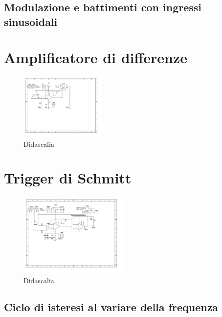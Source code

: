 \documentclass[journal]{IEEEtran}
\begin{document}
\subsection{Modulazione e battimenti con ingressi sinusoidali}



\section{Amplificatore di differenze} %
\begin{figure}[H]%
\begin {center}
\includegraphics[width=0.38\textwidth]{sch-simulations/output/OPA-difference-amp.pdf}
\caption{Didascalia}
\label{fig:oscilloscope}
\end {center}
\end{figure}

\section{Trigger di Schmitt} %

\begin{figure}[H]%
\begin {center}
\includegraphics[width=0.48\textwidth]{sch-simulations/output/OPA-mixer-trigger.pdf}
\caption{Didascalia}
\label{fig:oscilloscope}
\end {center}
\end{figure}

\subsection{Ciclo di isteresi al variare della frequenza} %
\end{document}
